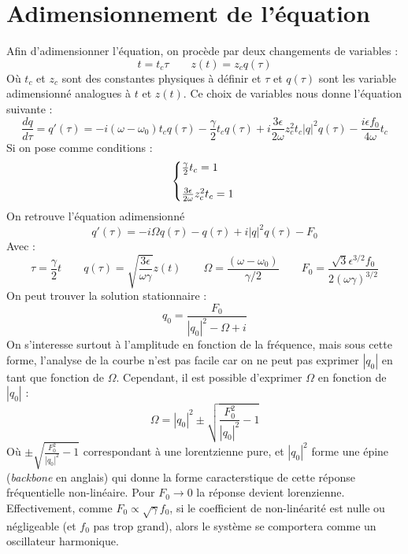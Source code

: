 \section{Adimensionnement de l'équation}
%
Afin d'adimensionner l'équation, on procède par deux changements de variables :
%
\begin{equation}
    t = t_c \tau
    \qquad 
    z(t) = z_c q(\tau)
\end{equation}
Où $t_c$ et $z_c$ sont des constantes physiques à définir et $\tau$ et $q(\tau)$ sont les variable adimensionné analogues à $t$ et $z(t)$.
Ce choix de variables nous donne l'équation suivante :
%
\begin{equation}
    \frac{dq}{d\tau} = q'(\tau) = -i(\omega - \omega_0)t_c q(\tau) - \frac{\gamma}{2}t_c q(\tau) + i \frac{3\epsilon}{2\omega}z_c^2t_c |q|^2q(\tau) - \frac{i\epsilon f_0}{4\omega}t_c
\end{equation}
%
Si on pose comme conditions :
%
\begin{equation}
    \left\{
    \begin{array}{@{}l@{}}
        \frac{\gamma}{2}t_c = 1 \\
        \\
        \frac{3\epsilon}{2\omega}z_c^2t_c = 1
    \end{array}
    \right.\,
\end{equation}
%
On retrouve l'équation adimensionné
%
\begin{equation}
    q'(\tau) = -i\Omega q(\tau) - q(\tau) + i|q|^2q(\tau) - F_0
\end{equation}
%
Avec :
%
\begin{equation}
    \tau = \frac{\gamma}{2}t
    \qquad
    q(\tau) = \sqrt{\frac{3\epsilon}{\omega\gamma}}z(t)
    \qquad
    \Omega = \frac{(\omega - \omega_0)}{\gamma/2}
    \qquad
    F_0 = \frac{\sqrt{3}\epsilon^{3/2} f_0}{2(\omega \gamma)^{3/2}}
\end{equation}
%
On peut trouver la solution stationnaire :
%
\begin{equation}
    q_0 = \frac{F_0}{|q_0|^2 - \Omega + i}
    \label{eq:duff_stationnaire}
\end{equation}
%
On s'interesse surtout à l'amplitude en fonction de la fréquence, 
mais sous cette forme, l'analyse de la courbe n'est pas facile car 
on ne peut pas exprimer $|q_0|$ en tant que fonction de $\Omega$. 
Cependant, il est possible d'exprimer $\Omega$ en fonction de $|q_0|$ :
%
\begin{equation}
    \Omega = |q_0|^2 \pm \sqrt{\frac{F_0^2}{|q_0|^2} - 1 }
\end{equation}
%
Où $\pm \sqrt{\frac{F_0^2}{|q_0|^2} - 1 }$ correspondant à une lorentzienne pure, et $|q_0|^2$ forme 
une épine (\emph{backbone} en anglais) qui donne la forme caracterstique de cette réponse fréquentielle non-linéaire.
%
Pour $F_0 \to 0$ la réponse devient lorenzienne. Effectivement, comme $F_0 \propto \sqrt{\gamma} f_0$, 
si le coefficient de non-linéarité est nulle ou négligeable (et $f_0$ pas trop grand), alors le système 
se comportera comme un oscillateur harmonique.

